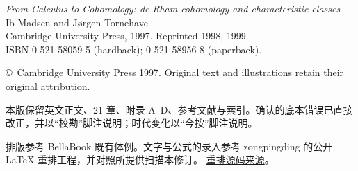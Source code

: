\thispagestyle{empty}
\vspace*{\fill}
{\small
\textit{From Calculus to Cohomology: de Rham cohomology and characteristic classes}\\
Ib Madsen and Jørgen Tornehave\\
Cambridge University Press, 1997. Reprinted 1998, 1999.\\
ISBN 0 521 58059 5 (hardback); 0 521 58956 8 (paperback).

\copyright\ Cambridge University Press 1997. Original text and illustrations retain their original attribution.

\medskip
本版保留英文正文、21 章、附录 A--D、参考文献与索引。确认的底本错误已直接改正，并以“校勘”脚注说明；时代变化以“今按”脚注说明。

排版参考 BellaBook 既有体例。文字与公式的录入参考 zongpingding 的公开 LaTeX 重排工程，并对照所提供扫描本修订。
\href{https://github.com/zongpingding/From-Calculus-to-Cohomology_Ib-Madsen-and-J-rgen-Tornehave}{重排源码来源}。
}
\vspace*{15mm}
\clearpage
